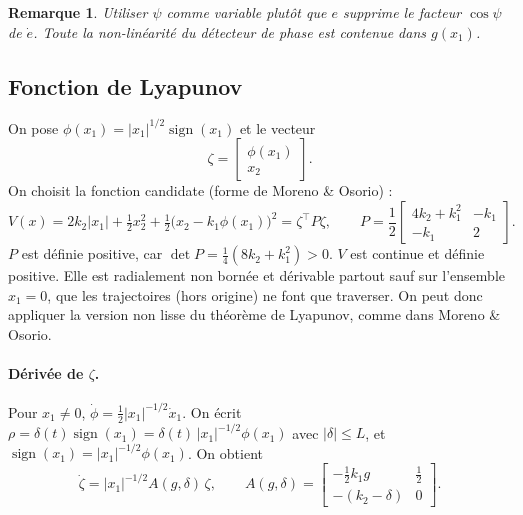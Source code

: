 \documentclass[11pt,a4paper]{article}
\newtheorem{remarque}{Remarque}
\newcommand{\sign}{\operatorname{sign}}
\begin{document}
\begin{remarque}
Utiliser $\psi$ comme variable plutôt que $e$ supprime le facteur $\cos\psi$ de $\dot e$.
Toute la non-linéarité du détecteur de phase est contenue dans $g(x_1)$.
\end{remarque}

\subsection{Fonction de Lyapunov}
On pose $\phi(x_1)=|x_1|^{1/2}\sign(x_1)$ et le vecteur
\begin{equation}
\zeta = \begin{bmatrix}\phi(x_1)\\ x_2\end{bmatrix}.
\end{equation}
On choisit la fonction candidate (forme de Moreno \& Osorio) :
\begin{equation}
V(x) = 2k_2|x_1| + \tfrac12 x_2^2 + \tfrac12\big(x_2 - k_1\phi(x_1)\big)^2 = \zeta^\top P\zeta,
\qquad
P = \frac12\begin{bmatrix}4k_2+k_1^2 & -k_1\\ -k_1 & 2\end{bmatrix}.
\end{equation}
$P$ est définie positive, car $\det P = \tfrac14(8k_2+k_1^2)>0$. $V$ est continue et
définie positive. Elle est radialement non bornée et dérivable partout sauf sur l'ensemble $x_1=0$,
que les trajectoires (hors origine) ne font que traverser. On peut donc appliquer la version
non lisse du théorème de Lyapunov, comme dans Moreno \& Osorio.

\paragraph{Dérivée de $\zeta$.} Pour $x_1\neq 0$, $\dot\phi = \tfrac12|x_1|^{-1/2}\dot x_1$.
On écrit $\rho = \delta(t)\sign(x_1) = \delta(t)\,|x_1|^{-1/2}\phi(x_1)$ avec $|\delta|\le L$, et
$\sign(x_1) = |x_1|^{-1/2}\phi(x_1)$. On obtient
\begin{equation}
\dot\zeta = |x_1|^{-1/2} A(g,\delta)\,\zeta,
\qquad
A(g,\delta)=\begin{bmatrix} -\tfrac12 k_1 g & \tfrac12 \\ -(k_2-\delta) & 0\end{bmatrix}.
\end{equation}
\end{document}

